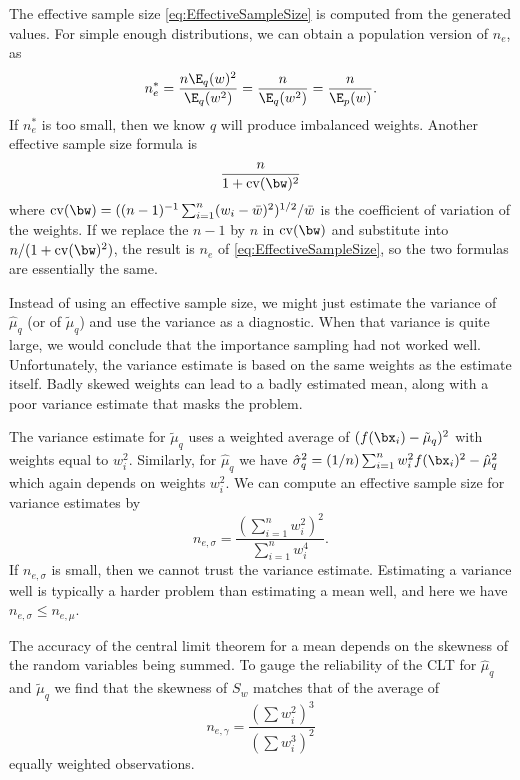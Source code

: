 The effective sample size \cref{eq:EffectiveSampleSize} is computed from the generated values. For simple enough distributions, we can obtain a population version of $n_e$, as
\begin{equation}
	n_e^* = \frac{n \E_q(w)^2}{\E_q(w^2)} = \frac{n}{\E_q(w^2)} = \frac{n}{\E_p(w)}.
	\label{eq:PopulationESS}
\end{equation}
If $n_e^*$ is too small, then we know $q$ will produce imbalanced weights. Another effective sample size formula is
\begin{equation}
	\frac{n}{1 + \mathrm{cv}(\bw)^2}
	\label{eq:ESS_CV}
\end{equation}
where $\mathrm{cv}(\bw) = ((n-1)^{-1} \sum_{i=1}^n (w_i - \bar{w})^2)^{1/2} / \bar{w}$ is the coefficient of variation of the weights. If we replace the $n-1$ by $n$ in $\mathrm{cv}(\bw)$ and substitute into $n/(1+\mathrm{cv}(\bw)^2)$, the result is $n_e$ of \cref{eq:EffectiveSampleSize}, so the two formulas are essentially the same.

Instead of using an effective sample size, we might just estimate the variance of $\hat{\mu}_q$ (or of $\tilde{\mu}_q$) and use the variance as a diagnostic. When that variance is quite large, we would conclude that the importance sampling had not worked well. Unfortunately, the variance estimate is based on the same weights as the estimate itself. Badly skewed weights can lead to a badly estimated mean, along with a poor variance estimate that masks the problem.

The variance estimate for $\tilde{\mu}_q$ uses a weighted average of $(f(\bx_i) - \tilde{\mu}_q)^2$ with weights equal to $w_i^2$. Similarly, for $\hat{\mu}_q$ we have $\hat{\sigma}_q^2 = (1/n) \sum_{i=1}^n w_i^2 f(\bx_i)^2 - \hat{\mu}_q^2$ which again depends on weights $w_i^2$. We can compute an effective sample size for variance estimates by
\begin{equation}
	n_{e, \sigma} = \frac{(\sum_{i=1}^n w_i^2)^2}{\sum_{i=1}^n w_i^4}.
	\label{eq:ESS_Variance}
\end{equation}
If $n_{e, \sigma}$ is small, then we cannot trust the variance estimate. Estimating a variance well is typically a harder problem than estimating a mean well, and here we have $n_{e, \sigma} \leq n_{e, \mu}$.

The accuracy of the central limit theorem for a mean depends on the skewness of the random variables being summed. To gauge the reliability of the CLT for $\hat{\mu}_q$ and $\tilde{\mu}_q$ we find that the skewness of $S_w$ matches that of the average of
\[
	n_{e, \gamma} = \frac{(\sum w_i^2)^3}{(\sum w_i^3)^2}
\]
equally weighted observations.

